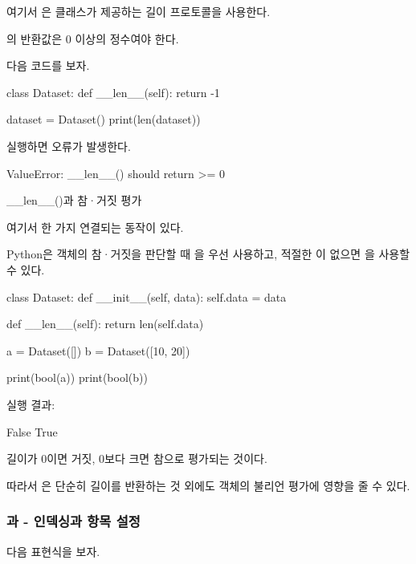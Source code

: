 여기서 은  클래스가 제공하는 길이 프로토콜을 사용한다.

의 반환값은 0 이상의 정수여야 한다.

다음 코드를 보자.

\begin{dhkcode}
class Dataset:
    def __len__(self):
        return -1

dataset = Dataset()
print(len(dataset))
\end{dhkcode}

실행하면 오류가 발생한다.

\begin{dhkzsh}
ValueError: __len__() should return >= 0
\end{dhkzsh}

\begin{dhknote}
\begin{dhksmry}[centered]
__len__()과 참·거짓 평가
\end{dhksmry}
\end{dhknote}

여기서 한 가지 연결되는 동작이 있다.

Python은 객체의 참·거짓을 판단할 때 을 우선 사용하고, 적절한 이 없으면 을 사용할 수 있다.

\begin{dhkcode}
class Dataset:
    def __init__(self, data):
        self.data = data

    def __len__(self):
        return len(self.data)


a = Dataset([])
b = Dataset([10, 20])

print(bool(a))
print(bool(b))
\end{dhkcode}

실행 결과:

\begin{dhkzsh}
False
True
\end{dhkzsh}

길이가 0이면 거짓, 0보다 크면 참으로 평가되는 것이다.

따라서 은 단순히 길이를 반환하는 것 외에도 객체의 불리언 평가에 영향을 줄 수 있다.

\subsubsection{과  - 인덱싱과 항목 설정}

다음 표현식을 보자.

